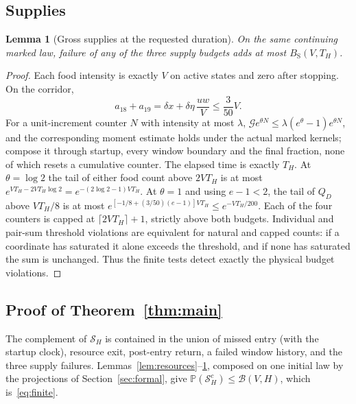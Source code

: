 \documentclass[11pt,a4paper]{article}
\theoremstyle{plain}
\newtheorem{lemma}[theorem]{Lemma}
\theoremstyle{definition}
\theoremstyle{remark}
\newcommand{\Prob}{\mathbb P}
\newcommand{\G}{\mathcal G}
\newcommand{\BS}{B_{\mathrm S}}
\newcommand{\Son}{\mathcal S}
\begin{document}
\subsection{Supplies}
\begin{lemma}[Gross supplies at the requested duration]\label{lem:supplies}
On the same continuing marked law, failure of any of the three supply budgets adds at most $\BS(V,T_H)$.
\end{lemma}
\begin{proof}
Each food intensity is exactly $V$ on active states and zero after stopping. On the corridor,
\[
 a_{18}+a_{19}=\delta x+\delta\eta\,\frac{uw}V\le\frac3{50}V.
\]
For a unit-increment counter $N$ with intensity at most $\lambda$, $\G e^{\theta N}\le\lambda(e^\theta-1)e^{\theta N}$, and the corresponding moment estimate holds under the actual marked kernels; compose it through startup, every window boundary and the final fraction, none of which resets a cumulative counter. The elapsed time is exactly $T_H$. At $\theta=\log2$ the tail of either food count above $2VT_H$ is at most $e^{VT_H-2VT_H\log2}=e^{-(2\log2-1)VT_H}$. At $\theta=1$ and using $e-1<2$, the tail of $Q_D$ above $VT_H/8$ is at most $e^{[-1/8+(3/50)(e-1)]VT_H}\le e^{-VT_H/200}$. Each of the four counters is capped at $\lceil2VT_H\rceil+1$, strictly above both budgets. Individual and pair-sum threshold violations are equivalent for natural and capped counts: if a coordinate has saturated it alone exceeds the threshold, and if none has saturated the sum is unchanged. Thus the finite tests detect exactly the physical budget violations.
\end{proof}

\subsection{Proof of Theorem~\ref{thm:main}}
The complement of $\Son_H$ is contained in the union of missed entry (with the startup clock), resource exit, post-entry return, a failed window history, and the three supply failures. Lemmas~\ref{lem:resources}--\ref{lem:supplies}, composed on one initial law by the projections of Section~\ref{sec:formal}, give $\Prob(\Son_H^c)\le\mathcal B(V,H)$, which is~\eqref{eq:finite}.
\end{document}
